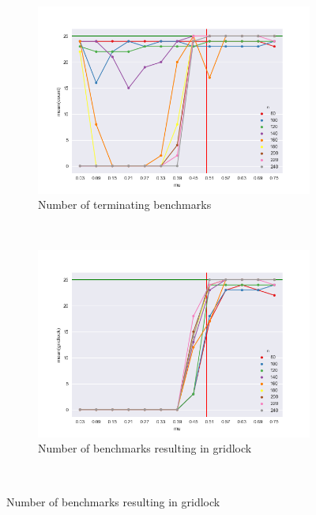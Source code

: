 \begin{figure}
	\centering
    \begin{subfigure}[b]{0.30\textwidth}
        \includegraphics[width=\textwidth]{fig/count_vs_mu}
        \caption{Number of terminating benchmarks}
        \label{fig:gull}
    \end{subfigure}
    ~%
    \begin{subfigure}[b]{0.30\textwidth}
        \includegraphics[width=\textwidth]{fig/gridlock_vs_mu}
        \caption{Number of benchmarks resulting in gridlock}
        \label{fig:tiger}
    \end{subfigure}
    ~%

\end{figure}
